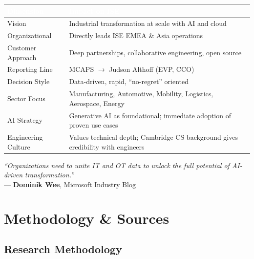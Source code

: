 \documentclass[11pt,a4paper]{article}
\begin{document}
\begin{center}
\begin{longtable}{L{3.5cm}L{10cm}}
\toprule
{}
\textcolor{white}{\textbf{Dimension}} & \textcolor{white}{\textbf{Impact on ISE}} \\
\midrule
Vision & Industrial transformation at scale with AI and cloud \\
Organizational & Directly leads ISE EMEA \& Asia operations \\
Customer Approach & Deep partnerships, collaborative engineering, open source \\
Reporting Line & MCAPS $\rightarrow$ Judson Althoff (EVP, CCO) \\
Decision Style & Data-driven, rapid, ``no-regret'' oriented \\
Sector Focus & Manufacturing, Automotive, Mobility, Logistics, Aerospace, Energy \\
AI Strategy & Generative AI as foundational; immediate adoption of proven use cases \\
Engineering Culture & Values technical depth; Cambridge CS background gives credibility with engineers \\
\bottomrule
\end{longtable}
\end{center}

\begin{center}
\begin{tcolorbox}[
    colback=mslightgray,
    colframe=msblue,
    boxrule=1pt,
    arc=3pt,
    left=10pt, right=10pt, top=8pt, bottom=8pt,
    width=0.9\textwidth
]
\textit{``Organizations need to unite IT and OT data to unlock the full potential of AI-driven transformation.''}\\[5pt]
\hfill --- \textbf{Dominik Wee}, Microsoft Industry Blog
\end{tcolorbox}
\end{center}

\section{Methodology \& Sources}

\subsection{Research Methodology}
\end{document}
